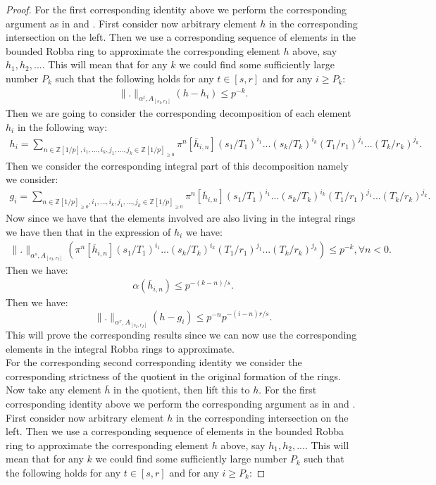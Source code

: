 \documentclass[12pt]{amsart}
\theoremstyle{definition}
\numberwithin{equation}{section}
\begin{document}
\begin{proof}
For the first corresponding identity above we perform the corresponding argument as in \cite[Lemma 5.2.6]{KL2} and \cite{T2}. First consider now arbitrary element $h$ in the corresponding intersection on the left. Then we use a corresponding sequence of elements in the bounded Robba ring to approximate the corresponding element $h$ above, say $h_1,h_2,...$. This will mean that for any $k$ we could find some sufficiently large number $P_k$ such that the following holds for any $t\in [s,r]$ and for any $i\geq P_k$:
\begin{align}
\|.\|_{\alpha^t,A_{[s_I,r_I]}}(h-h_i)\leq p^{-k}.	
\end{align}
Then we are going to consider the corresponding decomposition of each element $h_i$ in the following way:
\begin{align}
h_i=\sum_{n\in \mathbb{Z}[1/p],i_1,...,i_k,j_1,...,j_k\in \mathbb{Z}[1/p]_{\geq 0}}\pi^n[\overline{h}_{i,n}](s_1/T_1)^{i_1}...(s_k/T_k)^{i_k}(T_1/r_1)^{j_1}...(T_k/r_k)^{j_k}.	
\end{align}
Then we consider the corresponding integral part of this decomposition namely we consider:
\begin{align}
g_i=\sum_{n\in \mathbb{Z}[1/p]_{\geq 0},i_1,...,i_k,j_1,...,j_k\in \mathbb{Z}[1/p]_{\geq 0}}\pi^n[\overline{h}_{i,n}](s_1/T_1)^{i_1}...(s_k/T_k)^{i_k}(T_1/r_1)^{j_1}...(T_k/r_k)^{j_k}.	
\end{align}
Now since we have that the elements involved are also living in the integral rings we have then that in the expression of $h_i$ we have:
\begin{align}
\|.\|_{\alpha^s,A_{[s_I,r_I]}}(\pi^n[\overline{h}_{i,n}](s_1/T_1)^{i_1}...(s_k/T_k)^{i_k}(T_1/r_1)^{j_1}...(T_k/r_k)^{j_k})\leq p^{-k},\forall n<0.	
\end{align}
Then we have:
\begin{align}
{\alpha}(\overline{h}_{i,n})\leq p^{-(k-n)/s}.	
\end{align}
Then we have:
\begin{displaymath}
\|.\|_{\alpha^r,A_{[s_I,r_I]}}(h-g_i)\leq p^{-n}p^{-(i-n)r/s}.	
\end{displaymath}
This will prove the corresponding results since we can now use the corresponding elements in the integral Robba rings to approximate.\\
For the corresponding second corresponding identity we consider the corresponding strictness of the quotient in the original formation of the rings. Now take any element $\overline{h}$ in the quotient, then lift this to $h$. For the first corresponding identity above we perform the corresponding argument as in \cite[Lemma 5.2.6]{KL2} and \cite{T2}. First consider now arbitrary element $h$ in the corresponding intersection on the left. Then we use a corresponding sequence of elements in the bounded Robba ring to approximate the corresponding element $h$ above, say $h_1,h_2,...$. This will mean that for any $k$ we could find some sufficiently large number $P_k$ such that the following holds for any $t\in [s,r]$ and for any $i\geq P_k$:

\end{proof}
\end{document}
